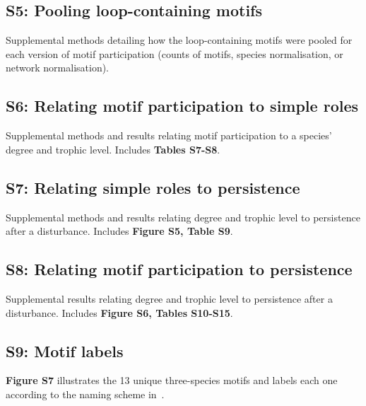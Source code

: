 \documentclass[12pt]{article}
\begin{document}
    \subsection*{S5: Pooling loop-containing motifs}

    	Supplemental methods detailing how the loop-containing motifs were pooled for each version of motif participation (counts of motifs, species normalisation, or network normalisation).


    \subsection*{S6: Relating motif participation to simple roles}

    	Supplemental methods and results relating motif participation to a species' degree and trophic level. Includes \textbf{Tables S7-S8}.


    \subsection*{S7: Relating simple roles to persistence}

        Supplemental methods and results relating degree and trophic level to persistence after a disturbance. Includes \textbf{Figure S5, Table S9}.


    \subsection*{S8: Relating motif participation to persistence}

    	Supplemental results relating degree and trophic level to persistence after a disturbance. Includes \textbf{Figure S6, Tables S10-S15}.

    \subsection*{S9: Motif labels}
        
        \textbf{Figure S7} illustrates the 13 unique three-species motifs and labels each one according to the naming scheme in~\citet{Stouffer2007}.
\end{document}
